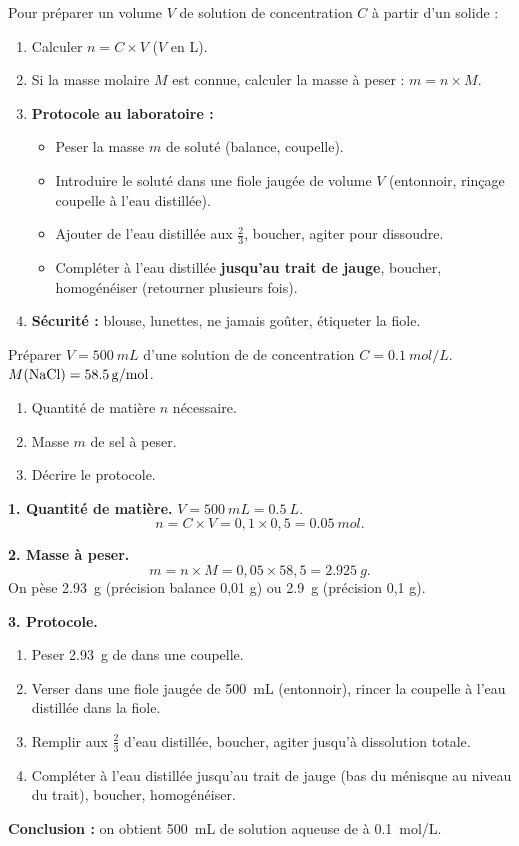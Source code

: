 \documentclass[11pt]{article}
\newcommand{\cle}[1]{{\popxbold\color{popdark}#1}}
\begin{document}
\begin{methode}
Pour préparer un volume $V$ de solution de concentration $C$ à partir d'un solide :
\begin{enumerate}
\item Calculer $n = C \times V$ ($V$ en L).
\item Si la masse molaire $M$ est connue, calculer la masse à peser : $m = n \times M$.
\item \textbf{Protocole au laboratoire :}
\begin{itemize}
\item Peser la masse $m$ de soluté (balance, coupelle).
\item Introduire le soluté dans une \cle{fiole jaugée} de volume $V$ (entonnoir, rinçage coupelle à l'eau distillée).
\item Ajouter de l'eau distillée aux $\frac{2}{3}$, boucher, agiter pour dissoudre.
\item Compléter à l'eau distillée \textbf{jusqu'au trait de jauge}, boucher, homogénéiser (retourner plusieurs fois).
\end{itemize}
\item \textbf{Sécurité :} blouse, lunettes, ne jamais goûter, étiqueter la fiole.
\end{enumerate}
\end{methode}

\begin{exoresolu}
Préparer $V = \SI{500}{mL}$ d'une solution de  de concentration $C = \SI{0,1}{mol/L}$. $M(\ce{NaCl}) = \SI{58,5}{g/mol}$.
\begin{enumerate}
\item Quantité de matière $n$ nécessaire.
\item Masse $m$ de sel à peser.
\item Décrire le protocole.
\end{enumerate}
\tcblower
\textbf{1. Quantité de matière.}
$V = \SI{500}{mL} = \SI{0,5}{L}$.
\[ n = C \times V = 0,1 \times 0,5 = \SI{0,05}{mol}. \]

\textbf{2. Masse à peser.}
\[ m = n \times M = 0,05 \times 58,5 = \SI{2,925}{g}. \]
On pèse \SI{2,93}{g} (précision balance 0,01 g) ou \SI{2,9}{g} (précision 0,1 g).

\textbf{3. Protocole.}
\begin{enumerate}
\item Peser \SI{2,93}{g} de  dans une coupelle.
\item Verser dans une fiole jaugée de \SI{500}{mL} (entonnoir), rincer la coupelle à l'eau distillée dans la fiole.
\item Remplir aux $\frac{2}{3}$ d'eau distillée, boucher, agiter jusqu'à dissolution totale.
\item Compléter à l'eau distillée jusqu'au trait de jauge (bas du ménisque au niveau du trait), boucher, homogénéiser.
\end{enumerate}

\textbf{Conclusion :} on obtient \SI{500}{mL} de solution aqueuse de  à \SI{0,1}{mol/L}.
\end{exoresolu}
\end{document}

